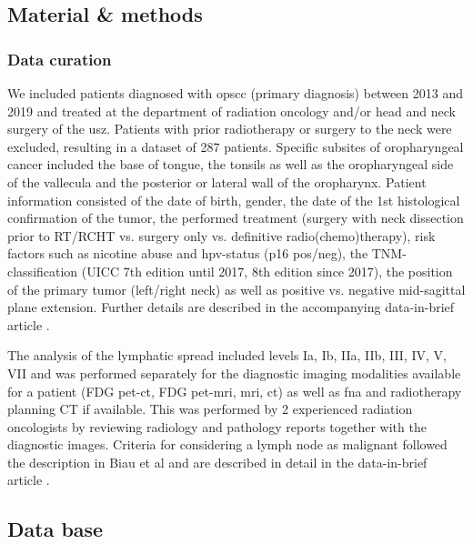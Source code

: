 \documentclass[\relativeRoot/main.tex]{subfiles}
\begin{document}
\subsection{Material \& methods}
\label{subsec:dataset:paper:material}

\subsubsection{Data curation}
\label{subsubsec:dataset:paper:material:curation}

We included patients diagnosed with \gls{opscc} (primary diagnosis) between 2013 and 2019 and treated at the department of radiation oncology and/or head and neck surgery of the \gls{usz}. Patients with prior radiotherapy or surgery to the neck were excluded, resulting in a dataset of 287 patients. Specific subsites of oropharyngeal cancer included the base of tongue, the tonsils as well as the oropharyngeal side of the vallecula and the posterior or lateral wall of the oropharynx. Patient information consisted of the date of birth, gender, the date of the 1st histological confirmation of the tumor, the performed treatment (surgery with neck dissection prior to RT/RCHT vs. surgery only vs. definitive radio(chemo)therapy), risk factors such as nicotine abuse and \gls{hpv}-status (p16 pos/neg), the TNM-classification (UICC 7th edition until 2017, 8th edition since 2017), the position of the primary tumor (left/right neck) as well as positive vs. negative mid-sagittal plane extension. Further details are described in the accompanying data-in-brief article \cite{ludwig_dataset_2021}.

The analysis of the lymphatic spread included levels Ia, Ib, IIa, IIb, III, IV, V, VII and was performed separately for the diagnostic imaging modalities available for a patient (FDG \gls{pet}-\gls{ct}, FDG \gls{pet}-\gls{mri}, \gls{mri}, \gls{ct}) as well as \gls{fna} and radiotherapy planning CT if available. This was performed by 2 experienced radiation oncologists by reviewing radiology and pathology reports together with the diagnostic images. Criteria for considering a lymph node as malignant followed the description in Biau et al \cite{biau_selection_2019} and are described in detail in the data-in-brief article \cite{ludwig_dataset_2021}.

\subsection{Data base}
\end{document}
